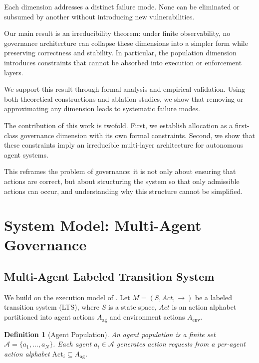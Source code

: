 \documentclass[11pt]{article}
\newtheorem{definition}[theorem]{Definition}
\newcommand{\Agents}{\mathcal{A}}
\begin{document}
Each dimension addresses a distinct failure mode. None can be eliminated or subsumed by another without introducing new vulnerabilities.

Our main result is an irreducibility theorem: under finite observability, no governance architecture can collapse these dimensions into a simpler form while preserving correctness and stability. In particular, the population dimension introduces constraints that cannot be absorbed into execution or enforcement layers.

We support this result through formal analysis and empirical validation. Using both theoretical constructions and ablation studies, we show that removing or approximating any dimension leads to systematic failure modes.

The contribution of this work is twofold. First, we establish allocation as a first-class governance dimension with its own formal constraints. Second, we show that these constraints imply an irreducible multi-layer architecture for autonomous agent systems.

This reframes the problem of governance: it is not only about ensuring that actions are correct, but about structuring the system so that only admissible actions can occur, and understanding why this structure cannot be simplified.

\section{System Model: Multi-Agent Governance}
\label{sec:model}

\subsection{Multi-Agent Labeled Transition System}

We build on the execution model of \cite{fernandez2026a}. Let $M = (S, \mathit{Act}, {\to})$ be a labeled transition system (LTS), where $S$ is a state space, $\mathit{Act}$ is an action alphabet partitioned into agent actions $A_{\mathrm{ag}}$ and environment actions $A_{\mathrm{env}}$.

\begin{definition}[Agent Population]
\label{def:agents}
An \emph{agent population} is a finite set $\Agents = \{a_1, \ldots, a_N\}$. Each agent $a_i \in \Agents$ generates action requests from a per-agent action alphabet $\mathrm{Act}_i \subseteq A_{\mathrm{ag}}$.
\end{definition}
\end{document}
